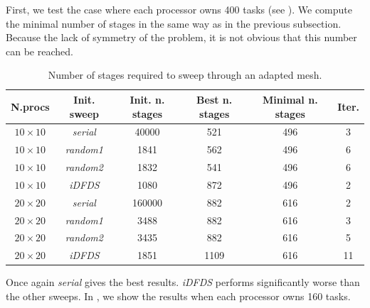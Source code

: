 \documentclass{mc2015}
\renewcommand{\(}{\left(}
\renewcommand{\)}{\right)}
\renewcommand{\[}{\left[}
\renewcommand{\]}{\right]}
\begin{document}
First, we test the case where each processor owns 400 tasks (see ).
We compute the minimal number of stages in the same way as in the previous subsection. Because
the lack of symmetry of the problem, it is not obvious that this number can be reached.

\begin{table}[H]
  \begin{center}
    \caption{Number of stages required to sweep through an adapted mesh.}
    \begin{tabular}{|c|c|c|c|c|c|}
      \hline
      N.procs & Init. sweep & Init. n. stages & Best n. stages & Minimal n. stages & Iter. \\
      \hline
      $10 \times 10$ &  \emph{serial} &  40000 &  521 & 496 &  3 \\
      $10 \times 10$ & \emph{random1} &   1841 &  562 & 496 &  6 \\
      $10 \times 10$ & \emph{random2} &   1832 &  541 & 496 &  6 \\
      $10 \times 10$ &   \emph{iDFDS} &   1080 &  872 & 496 &  2 \\
      $20 \times 20$ &  \emph{serial} & 160000 &  882 & 616 &  2 \\
      $20 \times 20$ & \emph{random1} &   3488 &  882 & 616 &  3 \\
      $20 \times 20$ & \emph{random2} &   3435 &  882 & 616 &  5 \\
      $20 \times 20$ &   \emph{iDFDS} &   1851 & 1109 & 616 & 11 \\
      \hline
    \end{tabular}
    \label{band_1}
  \end{center}
\end{table}

Once again \emph{serial} gives the best results. \emph{iDFDS} performs
significantly worse than the other sweeps. In , we show the results
when each processor owns 160 tasks.
\end{document}
